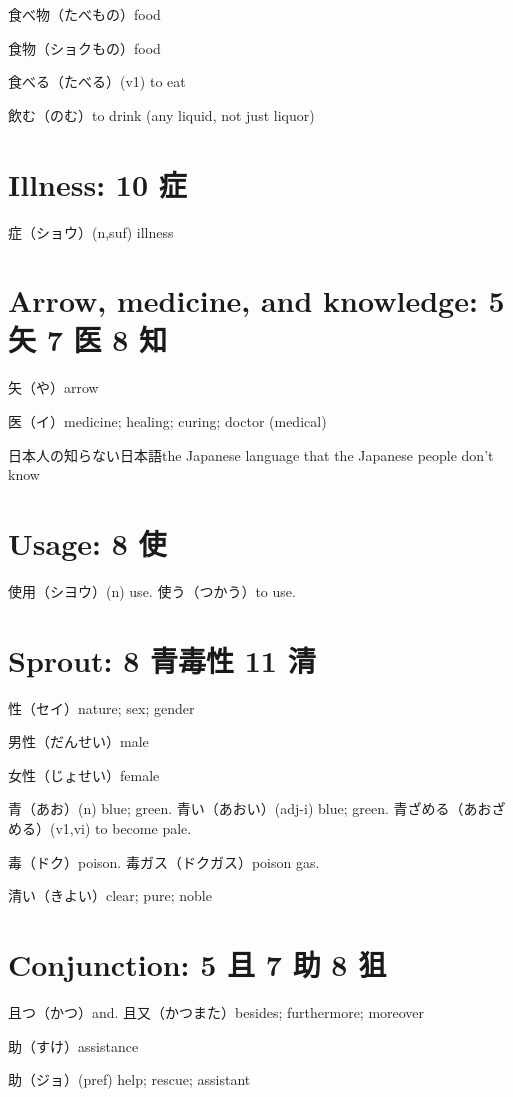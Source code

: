食べ物（たべもの）food

食物（ショクもの）food

食べる（たべる）(v1) to eat

飲む（のむ）to drink (any liquid, not just liquor)

\section{Illness: 10 症}

症（ショウ）(n,suf) illness

\section{Arrow, medicine, and knowledge: 5 矢 7 医 8 知}

矢（や）arrow

医（イ）medicine; healing; curing; doctor (medical)

日本人の知らない日本語the Japanese language that the Japanese people don't know

\section{Usage: 8 使}

使用（シヨウ）(n) use.
使う（つかう）to use.

\section{Sprout: 8 青毒性 11 清}

性（セイ）nature; sex; gender

男性（だんせい）male

女性（じょせい）female

青（あお）(n) blue; green.
青い（あおい）(adj-i) blue; green.
青ざめる（あおざめる）(v1,vi) to become pale.

毒（ドク）poison.
毒ガス（ドクガス）poison gas.

清い（きよい）clear; pure; noble

\section{Conjunction: 5 且 7 助 8 狙}

且つ（かつ）and.
且又（かつまた）besides; furthermore; moreover

助（すけ）assistance

助（ジョ）(pref) help; rescue; assistant

